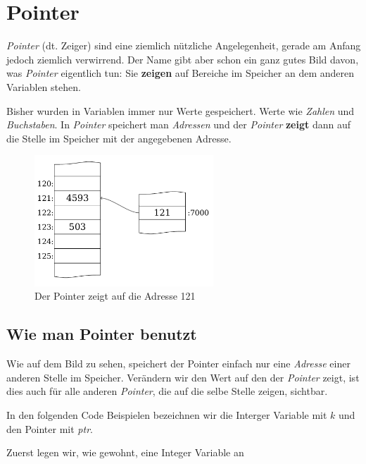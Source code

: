 \documentclass[c_worksheet.tex]{subfiles}
\begin{document}
	
\chapter{Pointer} 

\emph{Pointer} (dt. Zeiger) sind eine ziemlich nützliche Angelegenheit, gerade am Anfang jedoch ziemlich verwirrend. Der Name gibt aber schon ein ganz gutes Bild davon, was \emph{Pointer} eigentlich tun: Sie \textbf{zeigen} auf Bereiche im Speicher an dem anderen Variablen stehen.

Bisher wurden in Variablen immer nur Werte gespeichert. Werte wie \emph{Zahlen} und \emph{Buchstaben}. In \emph{Pointer} speichert man \emph{Adressen} und der \emph{Pointer} \textbf{zeigt} dann auf die Stelle im Speicher mit der angegebenen Adresse.

\begin{figure}[h]
\centering
\includegraphics[width=0.6\textwidth]{./Grafiken/Pointer/pointer_stack}
\caption{Der Pointer zeigt auf die Adresse 121} 
\end{figure}


\section{Wie man Pointer benutzt} 

Wie auf dem Bild zu sehen, speichert der Pointer einfach nur eine \emph{Adresse} einer anderen Stelle im Speicher. Verändern wir den Wert auf den der \emph{Pointer} zeigt, ist dies auch für alle anderen \emph{Pointer}, die auf die selbe Stelle zeigen, sichtbar.

In den folgenden Code Beispielen bezeichnen wir die Interger Variable mit \(k\) und den Pointer mit \emph{ptr}.

Zuerst legen wir, wie gewohnt, eine Integer Variable an


\end{document}
